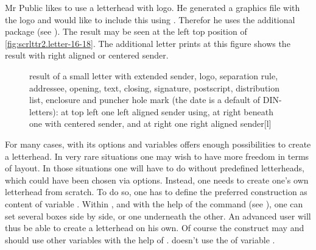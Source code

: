 \begin{Example}
  Mr Public likes to use a letterhead with logo. He generated a graphics file
  with the logo and would like to include this using
  . Therefor he uses the additional package
   (see \cite{package:graphics}).%
  The result may be seen at the left top position of
  \autoref{fig:scrlttr2.letter-16-18}. The additional letter prints at this
  figure shows the result with right aligned or centered sender.
  \begin{figure}
    \setcapindent{0pt}%
    {\hfill
      \quad
      \par\bigskip}
    \begin{captionbeside}
      {result of a small letter with extended sender, logo, separation rule,
        addressee, opening, text, closing, signature, postscript, distribution
        list, enclosure and puncher hole mark (the date is a default of
        DIN-letters): at top left one left aligned sender using, at right
        beneath one with centered sender, and at right one right aligned
        sender}[l]
      \quad
    \end{captionbeside}
  \label{fig:scrlttr2.letter-16-18}
  \end{figure}
\end{Example}%
%
%
%

\begin{Declaration}
\end{Declaration}
%
For many cases,  with its options and variables offers
enough possibilities to create a letterhead. In very rare situations
one may wish to have more freedom in terms of layout. In those
situations one will have to do without predefined letterheads, which
could have been chosen via options. Instead, one needs to create one's
own letterhead from scratch. To do so, one has to define the preferred
construction as content of variable . Within
, and with the help of the  command
(see \cite{latex:usrguide}), one can set several boxes side by side,
or one underneath the other. An advanced user will thus be able to
create a letterhead on his own. Of course the construct may
and should use other variables with the help of
. \KOMAScript{} doesn't use the
 of variable .

